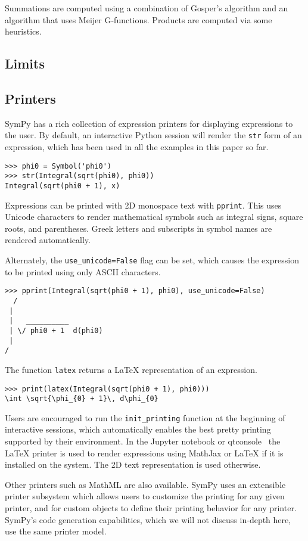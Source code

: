 Summations are computed using a combination of Gosper's algorithm and an
algorithm that uses Meijer G-functions. Products are computed via some
heuristics.

\subsection{Limits}



\subsection{Printers}

SymPy has a rich collection of expression printers for displaying expressions
to the user. By default, an interactive Python session will render the
\verb|str| form of an expression, which has been used in all the examples in
this paper so far.

\begin{verbatim}
>>> phi0 = Symbol('phi0')
>>> str(Integral(sqrt(phi0), phi0))
Integral(sqrt(phi0 + 1), x)
\end{verbatim}

Expressions can be printed with 2D monospace text with \verb|pprint|. This
uses Unicode characters to render mathematical symbols such as integral signs,
square roots, and parentheses. Greek letters and subscripts in symbol names
are rendered automatically.

Alternately, the \verb|use_unicode=False| flag can be set, which causes the
expression to be printed using only ASCII characters.

\begin{verbatim}
>>> pprint(Integral(sqrt(phi0 + 1), phi0), use_unicode=False)
  /
 |
 |   __________
 | \/ phi0 + 1  d(phi0)
 |
/
\end{verbatim}

The function \verb|latex| returns a \LaTeX{} representation of an expression.

\begin{verbatim}
>>> print(latex(Integral(sqrt(phi0 + 1), phi0)))
\int \sqrt{\phi_{0} + 1}\, d\phi_{0}
\end{verbatim}

Users are encouraged to run the \verb|init_printing| function at the beginning
of interactive sessions, which automatically enables the best pretty printing
supported by their environment. In the Jupyter notebook or
qtconsole~\cite{perez2007ipython} the \LaTeX{} printer is used to render
expressions using MathJax or \LaTeX{} if it is installed on the system. The 2D
text representation is used otherwise.

Other printers such as MathML are also available. SymPy uses an extensible
printer subsystem which allows users to customize the printing for any given
printer, and for custom objects to define their printing behavior for any
printer. SymPy's code generation capabilities, which we will not discuss
in-depth here, use the same printer model.
